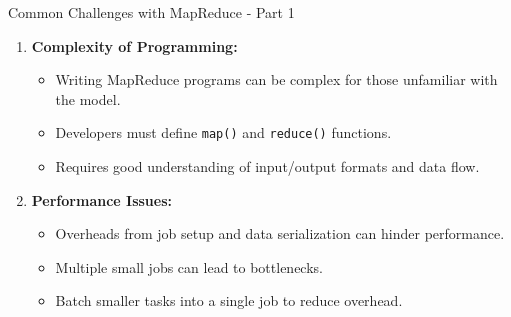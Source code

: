 \documentclass[aspectratio=169]{beamer}
\begin{document}
\begin{frame}{Common Challenges with MapReduce - Part 1}
    \begin{enumerate}
        \item \textbf{Complexity of Programming:}
            \begin{itemize}
                \item Writing MapReduce programs can be complex for those unfamiliar with the model.
                \item Developers must define \texttt{map()} and \texttt{reduce()} functions.
                \item Requires good understanding of input/output formats and data flow.
            \end{itemize}
        
        \item \textbf{Performance Issues:}
            \begin{itemize}
                \item Overheads from job setup and data serialization can hinder performance.
                \item Multiple small jobs can lead to bottlenecks.
                \item Batch smaller tasks into a single job to reduce overhead.
            \end{itemize}
    \end{enumerate}
\end{frame}
\end{document}
